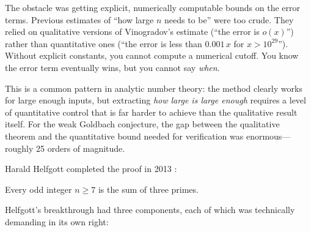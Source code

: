 The obstacle was getting explicit, numerically computable bounds on the error terms. Previous estimates of ``how large $n$ needs to be'' were too crude. They relied on qualitative versions of Vinogradov's estimate (``the error is $o(x)$'') rather than quantitative ones (``the error is less than $0.001\,x$ for $x > 10^{29}$''). Without explicit constants, you cannot compute a numerical cutoff. You know the error term eventually wins, but you cannot say \emph{when}.

This is a common pattern in analytic number theory: the method clearly works for large enough inputs, but extracting \emph{how large is large enough} requires a level of quantitative control that is far harder to achieve than the qualitative result itself. For the weak Goldbach conjecture, the gap between the qualitative theorem and the quantitative bound needed for verification was enormous---roughly 25 orders of magnitude.

Harald Helfgott completed the proof in 2013 \cite{helfgott2013}:

\begin{theorem}
Every odd integer $n \geq 7$ is the sum of three primes.
\end{theorem}

Helfgott's breakthrough had three components, each of which was technically demanding in its own right:

